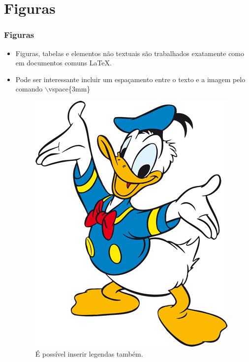\documentclass[mathsans,times]{beamer}
\begin{document}
\section{Figuras}
\begin{frame}
	\frametitle{Figuras}
	\begin{itemize}
		\item Figuras, tabelas e elementos não textuais são trabalhados exatamente como em documentos comuns LaTeX.
		\vspace{3mm}
		\item Pode ser interessante incluir um espaçamento entre o texto e a imagem pelo comando $\backslash$vspace\{3mm\}
		\vspace{3mm}
		\begin{figure}[!htpb]
			\centering\includegraphics[width=0.3\linewidth]{img/donald-duck.png}
			\caption{É possível inserir legendas também.}
		\end{figure}
		
	\end{itemize}
\end{frame}
\end{document}

